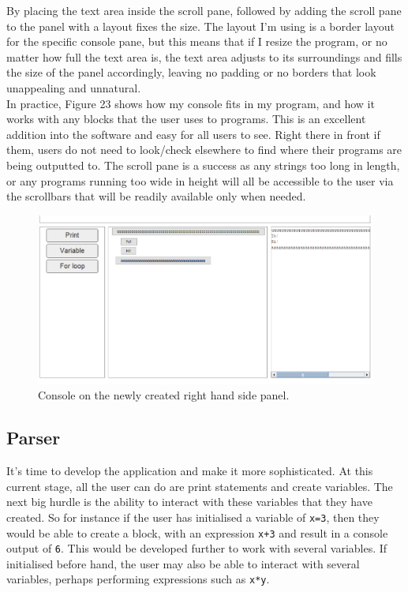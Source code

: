 \documentclass[a4paper, 12pt]{article}
\begin{document}
            By placing the text area inside the scroll pane, followed by adding the scroll pane to the panel
            with a layout fixes the size. The layout I'm using is a border layout for the specific console
            pane, but this means that if I resize the program, or no matter how full the text area is,
            the text area adjusts to its surroundings and fills the size of the panel accordingly, leaving
            no padding or no borders that look unappealing and unnatural. \\

            In practice, Figure 23 shows how my console fits in my program, and how it works with
            any blocks that the user uses to programs. This is an excellent addition into the software
            and easy for all users to see. Right there in front if them, users do not need to look/check
            elsewhere to find where their programs are being outputted to. The scroll pane is a success
            as any strings too long in length, or any programs running too wide in height will all be
            accessible to the user via the scrollbars that will be readily available only when needed.
            
            \begin{figure}[h]
                \centering
                \includegraphics[width=160mm]{console.png}
                \caption{Console on the newly created right hand side panel.}
            \end{figure}
          
        
        \clearpage
        \subsection{Parser}
            It's time to develop the application and make it more sophisticated. At this current stage, all
            the user can do are print statements and create variables. The next big hurdle is the ability
            to interact with these variables that they have created. So for instance if the user has
            initialised a variable of \texttt{x=3}, then they would be able to create a block, with an
            expression \texttt{x+3} and result in a console output of \texttt{6}. This would be developed
            further to work with several variables. If initialised before hand, the user may also be able
            to interact with several variables, perhaps performing expressions such as \texttt{x*y}. \\
\end{document}
